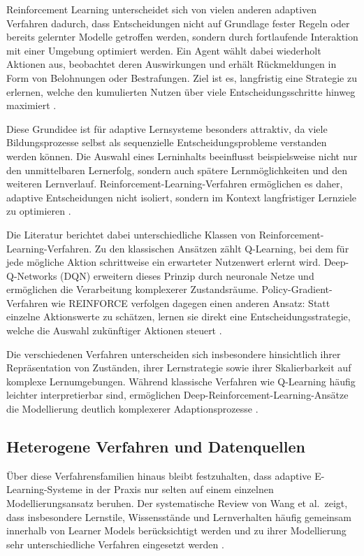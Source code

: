 Reinforcement Learning unterscheidet sich von vielen anderen adaptiven
Verfahren dadurch, dass Entscheidungen nicht auf Grundlage fester Regeln
oder bereits gelernter Modelle getroffen werden, sondern durch
fortlaufende Interaktion mit einer Umgebung optimiert werden. Ein Agent
wählt dabei wiederholt Aktionen aus, beobachtet deren Auswirkungen und
erhält Rückmeldungen in Form von Belohnungen oder Bestrafungen. Ziel ist
es, langfristig eine Strategie zu erlernen, welche den kumulierten
Nutzen über viele Entscheidungsschritte hinweg maximiert
\citep{Riedmann2025}.

Diese Grundidee ist für adaptive Lernsysteme besonders attraktiv, da
viele Bildungsprozesse selbst als sequenzielle Entscheidungsprobleme
verstanden werden können. Die Auswahl eines Lerninhalts beeinflusst
beispielsweise nicht nur den unmittelbaren Lernerfolg, sondern auch
spätere Lernmöglichkeiten und den weiteren Lernverlauf.
Reinforcement-Learning-Verfahren ermöglichen es daher, adaptive
Entscheidungen nicht isoliert, sondern im Kontext langfristiger
Lernziele zu optimieren \citep{Riedmann2025}.

Die Literatur berichtet dabei unterschiedliche Klassen von
Reinforcement-Learning-Verfahren. Zu den klassischen Ansätzen zählt
Q-Learning, bei dem für jede mögliche Aktion schrittweise ein erwarteter
Nutzenwert erlernt wird. Deep-Q-Networks (DQN) erweitern dieses Prinzip
durch neuronale Netze und ermöglichen die Verarbeitung komplexerer
Zustandsräume. Policy-Gradient-Verfahren wie REINFORCE verfolgen dagegen
einen anderen Ansatz: Statt einzelne Aktionswerte zu schätzen, lernen
sie direkt eine Entscheidungsstrategie, welche die Auswahl zukünftiger
Aktionen steuert \citep{Riedmann2025}.

Die verschiedenen Verfahren unterscheiden sich insbesondere hinsichtlich
ihrer Repräsentation von Zuständen, ihrer Lernstrategie sowie ihrer
Skalierbarkeit auf komplexe Lernumgebungen. Während klassische Verfahren
wie Q-Learning häufig leichter interpretierbar sind, ermöglichen
Deep-Reinforcement-Learning-Ansätze die Modellierung deutlich
komplexerer Adaptionsprozesse \citep{Riedmann2025}.

\subsection{Heterogene Verfahren und
Datenquellen}\label{heterogene-verfahren-und-datenquellen}

Über diese Verfahrensfamilien hinaus bleibt festzuhalten, dass adaptive
E-Learning-Systeme in der Praxis nur selten auf einem einzelnen
Modellierungsansatz beruhen. Der systematische Review von Wang et
al.~zeigt, dass insbesondere Lernstile, Wissensstände und Lernverhalten
häufig gemeinsam innerhalb von Learner Models berücksichtigt werden und
zu ihrer Modellierung sehr unterschiedliche Verfahren eingesetzt werden
\citep{Wang2025}.

